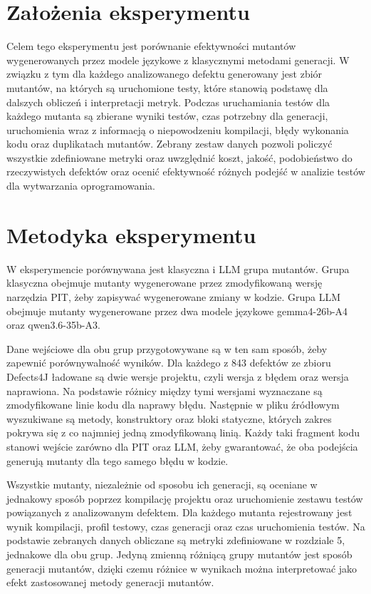 \documentclass[12pt,a4paper,oldfontcommands]{memoir}
\theoremstyle{plain}
\theoremstyle{definition}
\theoremstyle{remark}
\begin{document}
    \section{Założenia eksperymentu}

    Celem tego eksperymentu jest porównanie efektywności mutantów wygenerowanych przez modele językowe z klasycznymi metodami generacji.
    W związku z tym dla każdego analizowanego defektu \cite{ref3} generowany jest zbiór mutantów, na których są uruchomione testy, które stanowią podstawę dla dalszych obliczeń i interpretacji metryk.
    Podczas uruchamiania testów dla każdego mutanta są zbierane wyniki testów, czas potrzebny dla generacji, uruchomienia wraz z informacją o niepowodzeniu kompilacji, błędy wykonania kodu oraz duplikatach mutantów.
    Zebrany zestaw danych pozwoli policzyć wszystkie zdefiniowane metryki oraz uwzględnić koszt, jakość, podobieństwo do rzeczywistych defektów oraz ocenić efektywność różnych podejść w analizie testów dla wytwarzania oprogramowania.

    \section{Metodyka eksperymentu}


    W eksperymencie porównywana jest klasyczna i LLM grupa mutantów.
    Grupa klasyczna obejmuje mutanty wygenerowane przez zmodyfikowaną wersję narzędzia PIT, żeby zapisywać wygenerowane zmiany w kodzie.
    Grupa LLM obejmuje mutanty wygenerowane przez dwa modele językowe gemma4-26b-A4 oraz qwen3.6-35b-A3.

    Dane wejściowe dla obu grup przygotowywane są w ten sam sposób, żeby zapewnić porównywalność wyników.
    Dla każdego z 843 defektów ze zbioru Defects4J ładowane są dwie wersje projektu, czyli wersja z błędem oraz wersja naprawiona.
    Na podstawie różnicy między tymi wersjami wyznaczane są zmodyfikowane linie kodu dla naprawy błędu.
    Następnie w pliku źródłowym wyszukiwane są metody, konstruktory oraz bloki statyczne, których zakres pokrywa się z co najmniej jedną zmodyfikowaną linią.
    Każdy taki fragment kodu stanowi wejście zarówno dla PIT oraz LLM, żeby gwarantować, że oba podejścia generują mutanty dla tego samego błędu w kodzie.

    Wszystkie mutanty, niezależnie od sposobu ich generacji, są oceniane w jednakowy sposób poprzez kompilację projektu oraz uruchomienie zestawu testów powiązanych z analizowanym defektem.
    Dla każdego mutanta rejestrowany jest wynik kompilacji, profil testowy, czas generacji oraz czas uruchomienia testów.
    Na podstawie zebranych danych obliczane są metryki zdefiniowane w rozdziale 5, jednakowe dla obu grup.
    Jedyną zmienną różniącą grupy mutantów jest sposób generacji mutantów, dzięki czemu różnice w wynikach można interpretować jako efekt zastosowanej metody generacji mutantów.
\end{document}
